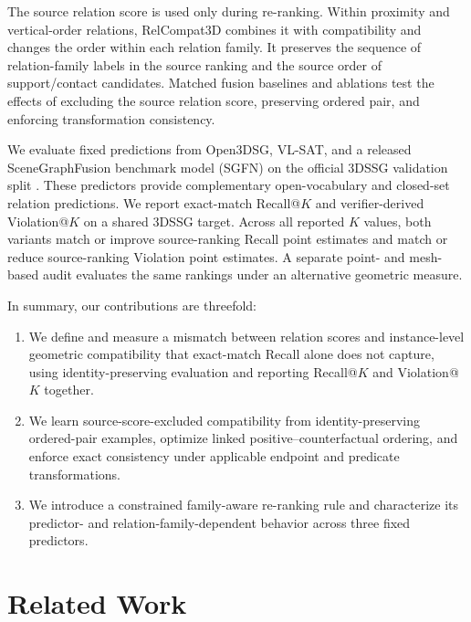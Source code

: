 The source relation score is used only during re-ranking. Within proximity and vertical-order relations, RelCompat3D combines it with compatibility and changes the order within each relation family. It preserves the sequence of relation-family labels in the source ranking and the source order of support/contact candidates. Matched fusion baselines and ablations test the effects of excluding the source relation score, preserving ordered pair, and enforcing transformation consistency. 

We evaluate fixed predictions from Open3DSG, VL-SAT, and a released SceneGraphFusion benchmark model (SGFN) on the official 3DSSG validation split \cite{wang2023vl,koch2024open3dsg,wu2021scenegraphfusion}. These predictors provide complementary open-vocabulary and closed-set relation predictions. We report exact-match Recall@$K$ and verifier-derived Violation@$K$ on a shared 3DSSG target. Across all reported $K$ values, both variants match or improve source-ranking Recall point estimates and match or reduce source-ranking Violation point estimates. A separate point- and mesh-based audit evaluates the same rankings under an alternative geometric measure. 

In summary, our contributions are threefold:
\begin{enumerate}
    \item We define and measure a mismatch between relation scores and instance-level geometric compatibility that exact-match Recall alone does not capture, using identity-preserving evaluation and reporting Recall@$K$ and Violation@$K$ together. 
    \item We learn source-score-excluded compatibility from identity-preserving ordered-pair examples, optimize linked positive--counterfactual ordering, and enforce exact consistency under applicable endpoint and predicate transformations.
    \item We introduce a constrained family-aware re-ranking rule and characterize its predictor- and relation-family-dependent behavior across three fixed predictors.
\end{enumerate}


\section{Related Work}
